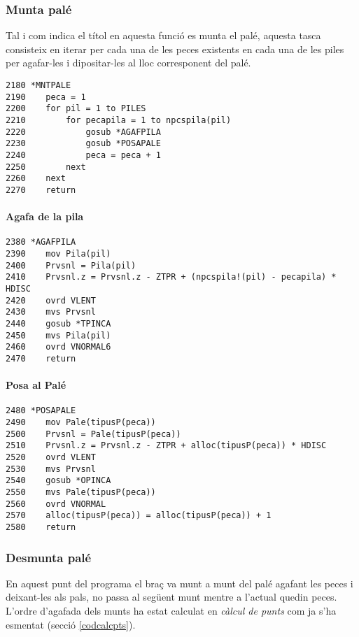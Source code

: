 \subsubsection{Munta palé}
Tal i com indica el títol en aquesta funció es munta el palé, aquesta tasca
consisteix en iterar per cada una de les peces existents en cada una de les
piles per agafar-les i dipositar-les al lloc corresponent del palé.

\begin{verbatim}
2180 *MNTPALE
2190    peca = 1
2200    for pil = 1 to PILES 
2210        for pecapila = 1 to npcspila(pil)
2220            gosub *AGAFPILA
2230            gosub *POSAPALE
2240            peca = peca + 1
2250        next
2260    next
2270    return
\end{verbatim}

\paragraph{Agafa de la pila}
\begin{verbatim}
2380 *AGAFPILA
2390    mov Pila(pil)
2400    Prvsnl = Pila(pil)
2410    Prvsnl.z = Prvsnl.z - ZTPR + (npcspila!(pil) - pecapila) * HDISC
2420    ovrd VLENT
2430    mvs Prvsnl
2440    gosub *TPINCA
2450    mvs Pila(pil)
2460    ovrd VNORMAL6
2470    return
\end{verbatim}

\newpage

\paragraph{Posa al Palé}
\begin{verbatim}
2480 *POSAPALE
2490    mov Pale(tipusP(peca))
2500    Prvsnl = Pale(tipusP(peca))
2510    Prvsnl.z = Prvsnl.z - ZTPR + alloc(tipusP(peca)) * HDISC
2520    ovrd VLENT
2530    mvs Prvsnl
2540    gosub *OPINCA
2550    mvs Pale(tipusP(peca))
2560    ovrd VNORMAL
2570    alloc(tipusP(peca)) = alloc(tipusP(peca)) + 1
2580    return
\end{verbatim}

\subsubsection{Desmunta palé}
En aquest punt del programa el braç va munt a munt del palé agafant les peces
i deixant-les als pals, no passa al següent munt mentre a l'actual quedin peces.
L'ordre d'agafada dels munts ha estat calculat en \emph{càlcul de punts} com ja s'ha
esmentat (secció \ref{codcalcpts}).

